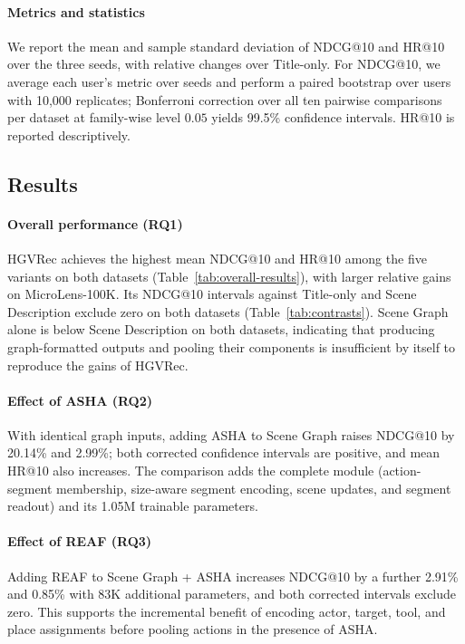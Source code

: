 \paragraph{Metrics and statistics}
We report the mean and sample standard deviation of NDCG@10 and HR@10 over the three seeds, with relative changes over Title-only.
For NDCG@10, we average each user's metric over seeds and perform a paired bootstrap over users with 10,000 replicates; Bonferroni correction over all ten pairwise comparisons per dataset at family-wise level $0.05$ yields 99.5\% confidence intervals.
HR@10 is reported descriptively.

\subsection{Results}
\label{sec:overall-results}
\paragraph{Overall performance (RQ1)}
HGVRec achieves the highest mean NDCG@10 and HR@10 among the five variants on both datasets (Table~\ref{tab:overall-results}), with larger relative gains on MicroLens-100K.
Its NDCG@10 intervals against Title-only and Scene Description exclude zero on both datasets (Table~\ref{tab:contrasts}).
Scene Graph alone is below Scene Description on both datasets, indicating that producing graph-formatted outputs and pooling their components is insufficient by itself to reproduce the gains of HGVRec.

\paragraph{Effect of ASHA (RQ2)}
\label{sec:asha-results}
With identical graph inputs, adding ASHA to Scene Graph raises NDCG@10 by 20.14\% and 2.99\%; both corrected confidence intervals are positive, and mean HR@10 also increases.
The comparison adds the complete module (action-segment membership, size-aware segment encoding, scene updates, and segment readout) and its 1.05M trainable parameters.

\paragraph{Effect of REAF (RQ3)}
\label{sec:reaf-results}
Adding REAF to Scene Graph + ASHA increases NDCG@10 by a further 2.91\% and 0.85\% with 83K additional parameters, and both corrected intervals exclude zero.
This supports the incremental benefit of encoding actor, target, tool, and place assignments before pooling actions in the presence of ASHA.

